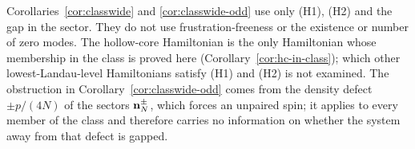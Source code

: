 \begin{remark}\label{rem:class-scope}
Corollaries~\ref{cor:classwide} and \ref{cor:classwide-odd} use only (H1), (H2) and the gap in the sector. They do not
use frustration-freeness or the existence or number of zero modes. The hollow-core Hamiltonian is the only
Hamiltonian whose membership in the class is proved here (Corollary~\ref{cor:hc-in-class}); which other
lowest-Landau-level Hamiltonians satisfy (H1) and (H2) is not examined. The obstruction in
Corollary~\ref{cor:classwide-odd} comes from the density defect $\pm p/(4N)$ of the sectors $\mathbf{n}^\pm_N$, which forces
an unpaired spin; it applies to every member of the class and therefore carries no information on whether the
system away from that defect is gapped.
\end{remark}
